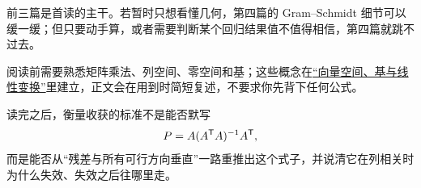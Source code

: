 前三篇是首读的主干。若暂时只想看懂几何，第四篇的 Gram--Schmidt 细节可以缓一缓；但只要动手算，或者需要判断某个回归结果值不值得相信，第四篇就跳不过去。

阅读前需要熟悉矩阵乘法、列空间、零空间和基；这些概念在\hyperref[ch:017]{``向量空间、基与线性变换''}里建立，正文会在用到时简短复述，不要求你先背下任何公式。

读完之后，衡量收获的标准不是能否默写
\[
P=A(A^{\mathsf{T}}A)^{-1}A^{\mathsf{T}},
\]
而是能否从``残差与所有可行方向垂直''一路重推出这个式子，并说清它在列相关时为什么失效、失效之后往哪里走。
